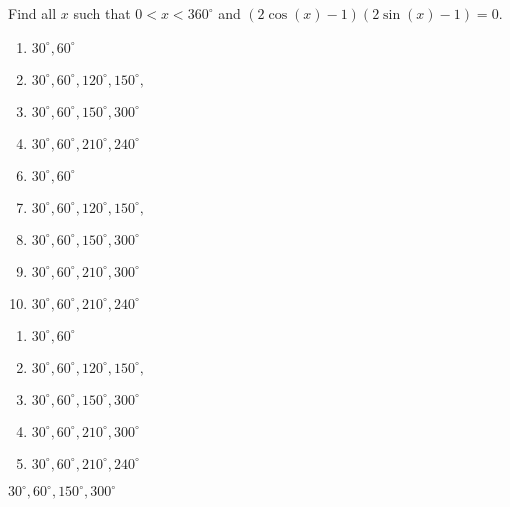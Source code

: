 


  Find all $x$ such that $0<x<360^\circ$ and $(2\cos(x)-1)(2\sin(x)-1)=0$.


\ifsat
	\begin{enumerate}[label=\Alph*)]
		\item    $30^\circ, 60^\circ$
		\item  $30^\circ, 60^\circ, 120^\circ, 150^\circ,$ 
		\item $30^\circ, 60^\circ, 150^\circ, 300^\circ $ %
		\item  $30^\circ, 60^\circ, 210^\circ,240^\circ$
	\end{enumerate}
\else
\fi

\ifacteven
	\begin{enumerate}[label=\textbf{\Alph*.},itemsep=\fill,align=left]
		\setcounter{enumii}{5}
		\item    $30^\circ, 60^\circ$
		\item  $30^\circ, 60^\circ, 120^\circ, 150^\circ,$ 
		\item $30^\circ, 60^\circ, 150^\circ, 300^\circ $ %
		\addtocounter{enumii}{1}
		\item $30^\circ, 60^\circ, 210^\circ, 300^\circ $ 
		\item  $30^\circ, 60^\circ, 210^\circ,240^\circ$
	\end{enumerate}
\else
\fi

\ifactodd
	\begin{enumerate}[label=\textbf{\Alph*.},itemsep=\fill,align=left]
		\item    $30^\circ, 60^\circ$
		\item  $30^\circ, 60^\circ, 120^\circ, 150^\circ,$ 
		\item $30^\circ, 60^\circ, 150^\circ, 300^\circ $ %
		\item $30^\circ, 60^\circ, 210^\circ, 300^\circ $ 
		\item  $30^\circ, 60^\circ, 210^\circ,240^\circ$
	\end{enumerate}
\else
\fi

\ifgridin
 $30^\circ, 60^\circ, 150^\circ, 300^\circ $ %
		
\else
\fi

